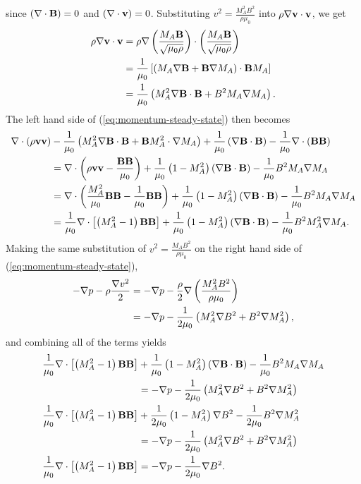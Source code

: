 since $\left( \nabla \cdot\mathbf{B} \right)=0$ and $\left( \nabla \cdot\mathbf{v} \right)=0$. Substituting $v^2 = \frac{M_A^2 B^2}{\rho\mu_0}$ into $\rho\nabla\mathbf{v}\cdot\mathbf{v}$, we get
\[\begin{split}
    \rho\nabla\mathbf{v}\cdot\mathbf{v} &= \rho\nabla\left( \frac{M_A \mathbf{B}}{\sqrt{\mu_0\rho}} \right)\cdot\left( \frac{M_A \mathbf{B}}{\sqrt{\mu_0\rho}} \right) \\
    &= \frac{1}{\mu_0}\left[ \left( M_A\nabla\mathbf{B} + \mathbf{B}\nabla M_A \right)\cdot\mathbf{B} M_A \right] \\
    &= \frac{1}{\mu_0}\left( M_A^2\nabla\mathbf{B}\cdot\mathbf{B} + B^2 M_A\nabla M_A \right). \\
\end{split}\]
The left hand side of (\ref{eq:momentum-steady-state}) then becomes
\[\begin{split}
    \nabla \cdot\left( \rho\mathbf{v}\mathbf{v} \right) &- \frac{1}{\mu_0}\left( M_A^2\nabla\mathbf{B}\cdot\mathbf{B} + \mathbf{B} M_A^2\cdot\nabla M_A \right) + \frac{1}{\mu_0}\left( \nabla\mathbf{B}\cdot\mathbf{B} \right) - \frac{1}{\mu_0}\nabla \cdot\left( \mathbf{B}\mathbf{B} \right) \\
    &= \nabla \cdot\left( \rho\mathbf{v}\mathbf{v} - \frac{\mathbf{B}\mathbf{B}}{\mu_0} \right) + \frac{1}{\mu_0}\left( 1-M_A^2 \right)\left( \nabla\mathbf{B}\cdot\mathbf{B} \right) - \frac{1}{\mu_0}B^2 M_A\nabla M_A \\
    &= \nabla \cdot\left( \frac{M_A^2}{\mu_0}\mathbf{B}\mathbf{B} - \frac{1}{\mu_0}\mathbf{B}\mathbf{B} \right) + \frac{1}{\mu_0}\left( 1-M_A^2 \right)\left( \nabla\mathbf{B}\cdot\mathbf{B} \right) - \frac{1}{\mu_0}B^2M_A\nabla M_A \\
    &= \frac{1}{\mu_0}\nabla \cdot\left[ \left( M_A^2-1 \right)\mathbf{B}\mathbf{B} \right] + \frac{1}{\mu_0}\left( 1-M_A^2 \right)\left( \nabla\mathbf{B}\cdot\mathbf{B} \right) - \frac{1}{\mu_0}B^2 M_A^2\nabla M_A. \\
\end{split}\]
Making the same substitution of $v^2 = \frac{M_A B^2}{\rho\mu_0}$ on the right hand side of (\ref{eq:momentum-steady-state}),
\[\begin{split}
    -\nabla p -\rho\frac{\nabla v^2}{2} &= -\nabla p -\frac{\rho}{2}\nabla\left( \frac{M_A^2 B^2}{\rho\mu_0} \right) \\
    &= -\nabla p - \frac{1}{2\mu_0}\left( M_A^2 \nabla B^2 + B^2\nabla M_A^2 \right), \\
\end{split}\]
and combining all of the terms yields
\[\begin{split}
    \frac{1}{\mu_0}\nabla \cdot\left[ \left( M_A^2-1 \right)\mathbf{B}\mathbf{B} \right] &+ \frac{1}{\mu_0}\left( 1-M_A^2 \right)\left( \nabla\mathbf{B}\cdot\mathbf{B} \right) - \frac{1}{\mu_0}B^2 M_A\nabla M_A \\
    &= -\nabla p - \frac{1}{2\mu_0}\left( M_A^2 \nabla B^2 + B^2\nabla M_A^2 \right) \\
    \frac{1}{\mu_0}\nabla \cdot\left[ \left( M_A^2-1 \right)\mathbf{B}\mathbf{B} \right] &+ \frac{1}{2\mu_0}\left( 1-M_A^2 \right)\nabla B^2 - \frac{1}{2\mu_0}B^2\nabla M_A^2 \\
    &= -\nabla p - \frac{1}{2\mu_0}\left( M_A^2 \nabla B^2 + B^2\nabla M_A^2 \right) \\
    \frac{1}{\mu_0}\nabla \cdot\left[ \left( M_A^2-1 \right)\mathbf{B}\mathbf{B} \right] &= - \nabla p -\frac{1}{2\mu_0}\nabla B^2. \\
\end{split}\]
